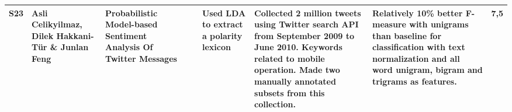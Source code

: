 \begin{sidewaystable}
\begin{longtable}{|c|p{3cm}|p{4cm}|p{0.6cm}|p{1cm}|p{1.3cm}|p{4cm}|p{3cm}|p{0.3cm}|}
    S23 & Asli Celikyilmaz, Dilek Hakkani-T\"{u}r \& Junlan Feng  & Probabilistic Model-based Sentiment Analysis Of Twitter Messages & \citeyear{celikyilmaz2010probabilistic} &  & Used LDA to extract a polarity lexicon & Collected 2 million tweets using Twitter search API from September 2009 to June 2010. Keywords related to mobile operation. Made two manually annotated subsets from this collection. & Relatively 10\% better F-measure with unigrams than baseline for classification with text normalization and all word unigram, bigram and trigrams as features. & 7,5 \\ \hline  
    
    \end{longtable}
\end{sidewaystable}

\addtocounter{table}{-1}